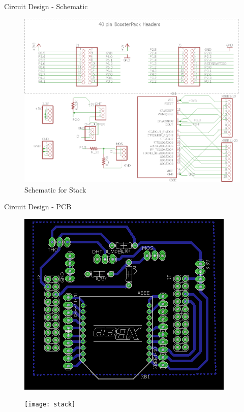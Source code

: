 \documentclass[t]{beamer} %
\begin{document}
\begin{frame}{Circuit Design - Schematic}
	\begin{figure}[!ht]
	\centering
\includegraphics[scale=0.6]{Stack_schematic_1}
\caption{Schematic for Stack}
\end{figure}
\end{frame}

\begin{frame}{Circuit Design - PCB}
\fboxsep=0pt
\noindent
\begin{minipage}[t]{0.48\linewidth}
\vspace{2cm}
	\begin{figure}[!ht]
	\centering
\includegraphics[scale=0.6]{Stack_board}
	\end{figure}
\end{minipage}
\hfill
\begin{minipage}[t]{0.48\linewidth}
    \begin{figure}[!ht]
    \vspace{1.5cm}
	\centering
\texttt{[image: stack]}
	\end{figure}
\end{minipage}
\end{frame} 
\end{document}
